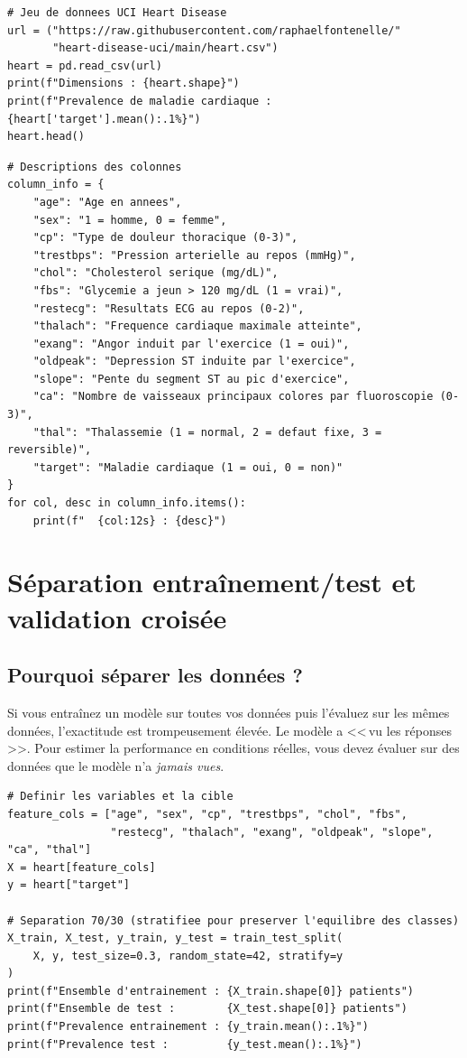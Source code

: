 \begin{verbatim}
# Jeu de donnees UCI Heart Disease
url = ("https://raw.githubusercontent.com/raphaelfontenelle/"
       "heart-disease-uci/main/heart.csv")
heart = pd.read_csv(url)
print(f"Dimensions : {heart.shape}")
print(f"Prevalence de maladie cardiaque : {heart['target'].mean():.1%}")
heart.head()
\end{verbatim}

\begin{verbatim}
# Descriptions des colonnes
column_info = {
    "age": "Age en annees",
    "sex": "1 = homme, 0 = femme",
    "cp": "Type de douleur thoracique (0-3)",
    "trestbps": "Pression arterielle au repos (mmHg)",
    "chol": "Cholesterol serique (mg/dL)",
    "fbs": "Glycemie a jeun > 120 mg/dL (1 = vrai)",
    "restecg": "Resultats ECG au repos (0-2)",
    "thalach": "Frequence cardiaque maximale atteinte",
    "exang": "Angor induit par l'exercice (1 = oui)",
    "oldpeak": "Depression ST induite par l'exercice",
    "slope": "Pente du segment ST au pic d'exercice",
    "ca": "Nombre de vaisseaux principaux colores par fluoroscopie (0-3)",
    "thal": "Thalassemie (1 = normal, 2 = defaut fixe, 3 = reversible)",
    "target": "Maladie cardiaque (1 = oui, 0 = non)"
}
for col, desc in column_info.items():
    print(f"  {col:12s} : {desc}")
\end{verbatim}

\section{S\'eparation entra\^inement/test et validation crois\'ee}

\subsection{Pourquoi s\'eparer les donn\'ees ?}

Si vous entra\^inez un mod\`ele sur toutes vos donn\'ees puis l'\'evaluez sur les m\^emes donn\'ees, l'exactitude est trompeusement \'elev\'ee. Le mod\`ele a <<\,vu les r\'eponses\,>>. Pour estimer la performance en conditions r\'eelles, vous devez \'evaluer sur des donn\'ees que le mod\`ele n'a \emph{jamais vues}.

\begin{verbatim}
# Definir les variables et la cible
feature_cols = ["age", "sex", "cp", "trestbps", "chol", "fbs",
                "restecg", "thalach", "exang", "oldpeak", "slope", "ca", "thal"]
X = heart[feature_cols]
y = heart["target"]

# Separation 70/30 (stratifiee pour preserver l'equilibre des classes)
X_train, X_test, y_train, y_test = train_test_split(
    X, y, test_size=0.3, random_state=42, stratify=y
)
print(f"Ensemble d'entrainement : {X_train.shape[0]} patients")
print(f"Ensemble de test :        {X_test.shape[0]} patients")
print(f"Prevalence entrainement : {y_train.mean():.1%}")
print(f"Prevalence test :         {y_test.mean():.1%}")
\end{verbatim}

